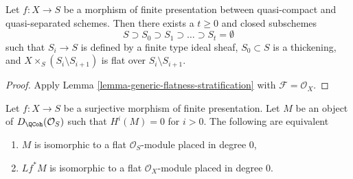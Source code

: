 \begin{lemma}
\label{lemma-generic-flatness-stratification-scheme}
Let $f : X \to S$ be a morphism of finite presentation between quasi-compact
and quasi-separated schemes. Then there exists a $t \geq 0$ and closed
subschemes
$$
S \supset S_0 \supset S_1 \supset \ldots \supset S_t = \emptyset
$$
such that $S_i \to S$ is defined by a finite type ideal sheaf,
$S_0 \subset S$ is a thickening, and
$X \times_S (S_i \setminus S_{i + 1})$ is flat over $S_i \setminus S_{i + 1}$.
\end{lemma}

\begin{proof}
Apply Lemma \ref{lemma-generic-flatness-stratification}
with $\mathcal{F} = \mathcal{O}_X$.
\end{proof}

\begin{lemma}
\label{lemma-flatness-criterion}
Let $f : X \to S$ be a surjective morphism of finite presentation.
Let $M$ be an object of $D_\QCoh(\mathcal{O}_S)$ such that
$H^i(M) = 0$ for $i > 0$. The following are equivalent
\begin{enumerate}
\item $M$ is isomorphic to a flat $\mathcal{O}_S$-module
placed in degree $0$,
\item $Lf^*M$ is isomorphic to a flat $\mathcal{O}_X$-module
placed in degree $0$.
\end{enumerate}
\end{lemma}

